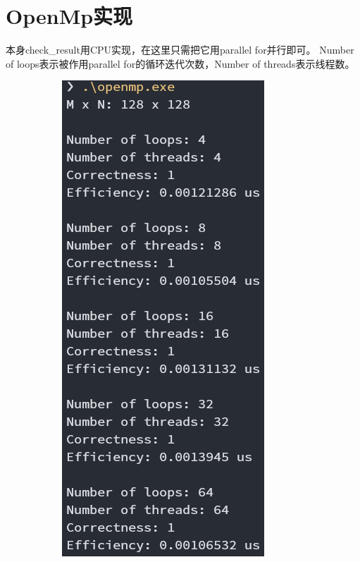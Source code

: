 \documentclass[UTF8, a4paper, 11pt]{article}
\begin{document}
\section{OpenMp实现}
本身check\_result用CPU实现，在这里只需把它用parallel for并行即可。
Number of loops表示被作用parallel for的循环迭代次数，Number of threads表示线程数。
\begin{figure}[H]
\begin{center}
\begin{subfigure}[b]{0.48\linewidth}
    \includegraphics[width=\textwidth]{omp128.png}

\end{subfigure}
\end{center}
\end{figure}
\end{document}
